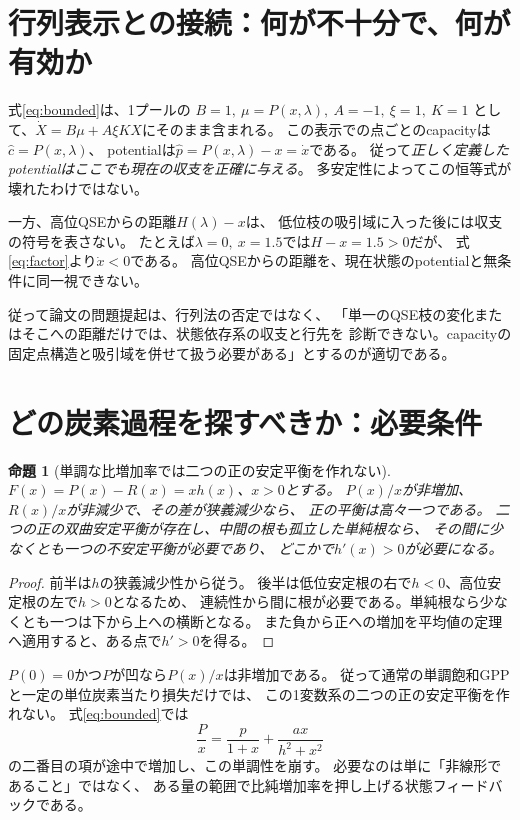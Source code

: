 \documentclass[a4paper,11pt]{ltjsarticle}
\newtheorem{proposition}{命題}
\begin{document}
\section{行列表示との接続：何が不十分で、何が有効か}
式\eqref{eq:bounded}は、1プールの
$B=1,\ \mu=P(x,\lambda),\ A=-1,\ \xi=1,\ K=1$
として、$\dot X=B\mu+A\xi KX$にそのまま含まれる。
この表示での点ごとのcapacityは$\widehat c=P(x,\lambda)$、
potentialは$\widehat p=P(x,\lambda)-x=\dot x$である。
従って\emph{正しく定義したpotentialはここでも現在の収支を正確に与える}。
多安定性によってこの恒等式が壊れたわけではない。

一方、高位QSEからの距離$H(\lambda)-x$は、
低位枝の吸引域に入った後には収支の符号を表さない。
たとえば$\lambda=0,\ x=1.5$では$H-x=1.5>0$だが、
式\eqref{eq:factor}より$\dot x<0$である。
高位QSEからの距離を、現在状態のpotentialと無条件に同一視できない。

従って論文の問題提起は、行列法の否定ではなく、
「単一のQSE枝の変化またはそこへの距離だけでは、状態依存系の収支と行先を
診断できない。capacityの固定点構造と吸引域を併せて扱う必要がある」とするのが適切である。

\section{どの炭素過程を探すべきか：必要条件}
\begin{proposition}[単調な比増加率では二つの正の安定平衡を作れない]
$F(x)=P(x)-R(x)=xh(x)$、$x>0$とする。
$P(x)/x$が非増加、$R(x)/x$が非減少で、その差が狭義減少なら、
正の平衡は高々一つである。
二つの正の双曲安定平衡が存在し、中間の根も孤立した単純根なら、
その間に少なくとも一つの不安定平衡が必要であり、
どこかで$h'(x)>0$が必要になる。
\end{proposition}
\begin{proof}
前半は$h$の狭義減少性から従う。
後半は低位安定根の右で$h<0$、高位安定根の左で$h>0$となるため、
連続性から間に根が必要である。単純根なら少なくとも一つは下から上への横断となる。
また負から正への増加を平均値の定理へ適用すると、ある点で$h'>0$を得る。
\end{proof}

$P(0)=0$かつ$P$が凹なら$P(x)/x$は非増加である。
従って通常の単調飽和GPPと一定の単位炭素当たり損失だけでは、
この1変数系の二つの正の安定平衡を作れない。
式\eqref{eq:bounded}では
\[
\frac{P}{x}=\frac{p}{1+x}+\frac{a x}{h^2+x^2}
\]
の二番目の項が途中で増加し、この単調性を崩す。
必要なのは単に「非線形であること」ではなく、
ある量の範囲で比純増加率を押し上げる状態フィードバックである。
\end{document}
